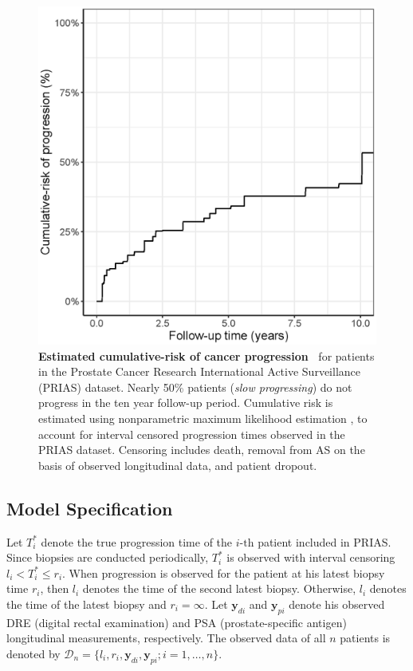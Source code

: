 \begin{figure}[!htb]
\captionsetup{justification=justified}
\centerline{\includegraphics[width=\columnwidth]{images/npmle_plot.eps}}
\caption{\textbf{Estimated cumulative-risk of cancer progression~\citep{tomer2020webapp}} for patients in the Prostate Cancer Research International Active Surveillance (PRIAS) dataset. Nearly 50\% patients (\textit{slow progressing}) do not progress in the ten year follow-up period. Cumulative risk is estimated using nonparametric maximum likelihood estimation \citep{turnbull1976empirical}, to account for interval censored progression times observed in the PRIAS dataset. Censoring includes death, removal from AS on the basis of observed longitudinal data, and patient dropout.}
\label{fig:npmle_plot}
\end{figure}

\subsection{Model Specification}
Let $T_i^*$ denote the true progression time of the ${i\mbox{-th}}$ patient included in PRIAS. Since biopsies are conducted periodically, $T_i^*$ is observed with interval censoring ${l_i < T_i^* \leq r_i}$. When progression is observed for the patient at his latest biopsy time $r_i$, then $l_i$ denotes the time of the second latest biopsy. Otherwise, $l_i$ denotes the time of the latest biopsy and ${r_i=\infty}$. Let $\boldsymbol{y}_{di}$ and $\boldsymbol{y}_{pi}$ denote his observed DRE (digital rectal examination) and PSA (prostate-specific antigen) longitudinal measurements, respectively. The observed data of all $n$ patients is denoted by ${\mathcal{D}_n = \{l_i, r_i, \boldsymbol{y}_{di}, \boldsymbol{y}_{pi}; i = 1, \ldots, n\}}$.

